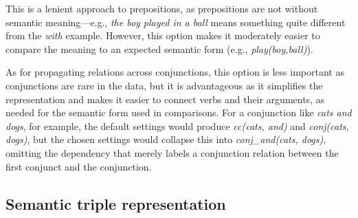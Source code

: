 This is a lenient approach to prepositions, as prepositions
are not without semantic meaning---e.g., \textit{the boy played in a
  ball} means something quite different from the \textit{with} example.  However, this option makes it moderately easier to compare the meaning to an expected semantic form (e.g., \textit{play(boy,ball)}).

As for propagating relations across conjunctions, this option is less important as conjunctions are rare in the data, but it is advantageous as it simplifies the representation and makes it easier to connect verbs and their arguments, as needed for the semantic form used in comparisons. For a conjunction like \textit{cats and dogs}, for example, the default settings would produce \textit{cc(cats, and)} and \textit{conj(cats, dogs)}, but the chosen settings would collapse this into \textit{conj\_and(cats, dogs)}, omitting the dependency that merely labels a conjunction relation between the first conjunct and the conjunction.


\subsection{Semantic triple representation}
%

